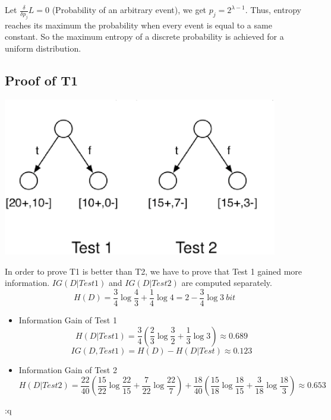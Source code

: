 \documentclass[a4paper, 12pt, titlepage]{article}
\begin{document}
Let $\frac{\delta}{\delta{}p_j}L=0$ (Probability of an arbitrary event), we get $p_j = 2^{\lambda-1}$. Thus, entropy reaches its maximum the probability when every event is equal to a same constant. So the maximum entropy of a discrete probability is achieved for a uniform distribution.

\subsection{Proof of T1}
\begin{center}

    \small

    \centering

    \includegraphics[width=12cm]{tests.eps}


    \label{uml}

\end{center} 
In order to prove T1 is better than T2, we have to prove that Test 1 gained more information. $IG(D|Test1)$ and $IG(D|Test2)$ are computed separately.
        $$H(D) = \frac{3}{4}\log{\frac{4}{3}}+\frac{1}{4}\log{4}=2-\frac{3}{4}\log{3}~bit$$
\begin{itemize}
        \item Information Gain of Test 1
            $$H(D|Test1) = \frac{3}{4}(\frac{2}{3}\log{\frac{3}{2}} + \frac{1}{3}\log{3}) \approx 0.689$$
            $$IG(D,Test1) = H(D) - H(D|Test) \approx 0.123$$
        \item Information Gain of Test 2
            $$H(D|Test2) = \frac{22}{40}(\frac{15}{22}\log{\frac{22}{15}} + \frac{7}{22}\log{\frac{22}{7}}) + \frac{18}{40}(\frac{15}{18}\log{\frac{18}{15}} + \frac{3}{18}\log{\frac{18}{3}})\approx 0.653$$
\end{itemize}:q
\end{document}
